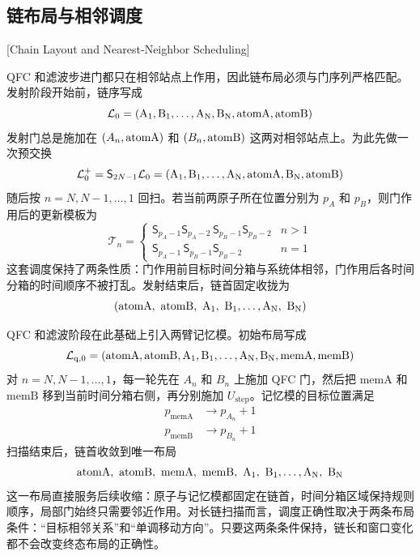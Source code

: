 \subsection{链布局与相邻调度}[Chain Layout and Nearest-Neighbor Scheduling]

QFC 和滤波步进门都只在相邻站点上作用，因此链布局必须与门序列严格匹配。发射阶段开始前，链序写成
\begin{equation}
\mathcal{L}_0=
({\rm A_1,B_1,\ldots,A_N,B_N,atomA,atomB})
\end{equation}
发射门总是施加在 $(A_n,{\rm atomA})$ 和 $(B_n,{\rm atomB})$ 这两对相邻站点上。为此先做一次预交换
\begin{equation}
\mathcal{L}_0^+=\mathsf{S}_{2N-1}\mathcal{L}_0=
({\rm A_1,B_1,\ldots,A_N,atomA,B_N,atomB})
\end{equation}
随后按 $n=N,N-1,\ldots,1$ 回扫。若当前两原子所在位置分别为 $p_A$ 和 $p_B$，则门作用后的更新模板为
\begin{equation}
\mathcal{T}_n=
\begin{cases}
\mathsf{S}_{p_A-1}\mathsf{S}_{p_A-2}\,\mathsf{S}_{p_B-1}\mathsf{S}_{p_B-2} & n>1\\
\mathsf{S}_{p_A-1}\,\mathsf{S}_{p_B-1}\mathsf{S}_{p_B-2} & n=1
\end{cases}
\label{eq:emission-swap-schedule}
\end{equation}
这套调度保持了两条性质：门作用前目标时间分箱与系统体相邻，门作用后各时间分箱的时间顺序不被打乱。发射结束后，链首固定收拢为
\begin{equation}
({\rm atomA,\ atomB,\ A_1,\ B_1,\ldots,A_N,\ B_N})
\label{eq:post-emission-layout}
\end{equation}


QFC 和滤波阶段在此基础上引入两臂记忆模。初始布局写成
\begin{equation}
\mathcal{L}_{\mathrm{q},0}=({\rm atomA,atomB,A_1,B_1,\ldots,A_N,B_N,memA,memB})
\end{equation}
对 $n=N,N-1,\ldots,1$，每一轮先在 $A_n$ 和 $B_n$ 上施加 QFC 门，然后把 $\mathrm{memA}$ 和 $\mathrm{memB}$ 移到当前时间分箱右侧，再分别施加 $U_{\mathrm{step}}$。记忆模的目标位置满足
\begin{align}
p_{\mathrm{memA}} &\rightarrow p_{A_n}+1\\
p_{\mathrm{memB}} &\rightarrow p_{B_n}+1
\label{eq:mem-adjacent-target}
\end{align}
扫描结束后，链首收敛到唯一布局
\begin{equation}
{\rm atomA,\ atomB,\ memA,\ memB,\ A_1,\ B_1,\ldots,A_N,\ B_N}
\label{eq:final-chain-layout}
\end{equation}
这一布局直接服务后续收缩：原子与记忆模都固定在链首，时间分箱区域保持规则顺序，局部门始终只需要邻近作用。对长链扫描而言，调度正确性取决于两条布局条件：“目标相邻关系”和“单调移动方向”。只要这两条条件保持，链长和窗口变化都不会改变终态布局的正确性。

